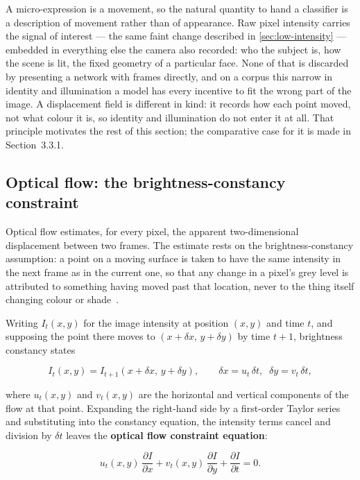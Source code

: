 A micro-expression is a movement, so the natural quantity to hand a classifier is a description of movement rather than of appearance. Raw pixel intensity carries the signal of interest --- the same faint change described in \autoref{sec:low-intensity} --- embedded in everything else the camera also recorded: who the subject is, how the scene is lit, the fixed geometry of a particular face. None of that is discarded by presenting a network with frames directly, and on a corpus this narrow in identity and illumination a model has every incentive to fit the wrong part of the image. A displacement field is different in kind: it records how each point moved, not what colour it is, so identity and illumination do not enter it at all. That principle motivates the rest of this section; the comparative case for it is made in Section~3.3.1.

\subsection{Optical flow: the brightness-constancy constraint}
\label{sec:optical-flow}

Optical flow estimates, for every pixel, the apparent two-dimensional displacement between two frames. The estimate rests on the brightness-constancy assumption: a point on a moving surface is taken to have the same intensity in the next frame as in the current one, so that any change in a pixel's grey level is attributed to something having moved past that location, never to the thing itself changing colour or shade~\cite{liong2019a}.

Writing $I_t(x,y)$ for the image intensity at position $(x,y)$ and time $t$, and supposing the point there moves to $(x+\delta x,\, y+\delta y)$ by time $t+1$, brightness constancy states

\[
	I_t(x,y) = I_{t+1}(x+\delta x,\, y+\delta y), \qquad \delta x = u_t\,\delta t,\;\; \delta y = v_t\,\delta t,
\]

where $u_t(x,y)$ and $v_t(x,y)$ are the horizontal and vertical components of the flow at that point. Expanding the right-hand side by a first-order Taylor series and substituting into the constancy equation, the intensity terms cancel and division by $\delta t$ leaves the \textbf{optical flow constraint equation}:

\[
	u_t(x,y)\,\frac{\partial I}{\partial x} + v_t(x,y)\,\frac{\partial I}{\partial y} + \frac{\partial I}{\partial t} = 0.
\]

